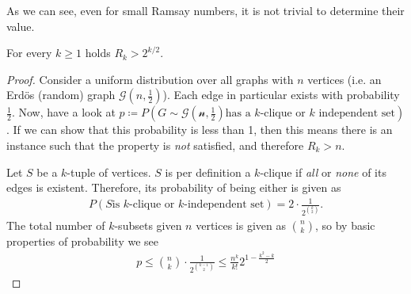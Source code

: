 As we can see, even for small Ramsay numbers, it is not trivial to determine their value.
\begin{theorem}
    For every $k \geq 1$ holds $R_k > 2^{k/2}$.
\end{theorem}
\begin{proof}
    Consider a uniform distribution over all graphs with $n$ vertices (i.e. an Erdös (random) graph $\mathcal{G}(n, \frac{1}{2})$).
    Each edge in particular exists with probability $\frac{1}{2}$.
    Now, have a look at $p \coloneqq P(G \sim \mathcal{G(n, \frac{1}{2})} \text{has a $k$-clique or $k$ independent set})$.
    If we can show that this probability is less than 1, then this means there is an instance such that the property is \emph{not} satisfied,
    and therefore $R_k > n$.

    Let $S$ be a $k$-tuple of vertices. $S$ is per definition a $k$-clique if \emph{all} or \emph{none} of its edges is existent.
    Therefore, its probability of being either is given as
    \begin{align}
        P(S \text{is $k$-clique or $k$-independent set}) = 2 \cdot \frac{1}{2^{\binom{k}{2}}}.
    \end{align}
    The total number of $k$-subsets given $n$ vertices is given as $\binom{n}{k}$, so by basic properties of probability we see
    \begin{align}
        p \leq \binom{n}{k} \cdot \frac{1}{2^{\binom{k-1}{2}}} \leq \frac{n^k}{k!} 2^{1-\frac{k^2-k}{2}}
    \end{align}
\end{proof}

